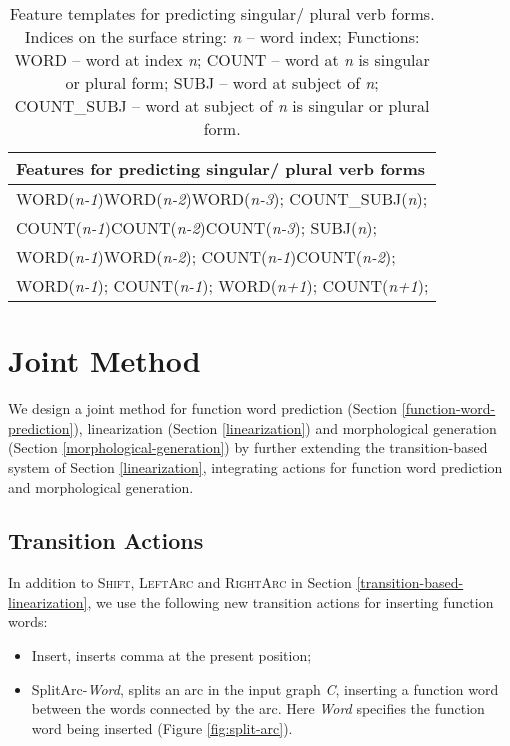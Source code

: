 \documentclass[11pt]{article}
\begin{document}
\begin{table}\centering
\footnotesize
\begin{tabular}{|l|}

  \hline
  Features for predicting singular/ plural verb forms\\
\hline
	WORD({\it n-1})WORD({\it n-2})WORD({\it n-3}); COUNT\_SUBJ({\it n});\\COUNT({\it n-1})COUNT({\it n-2})COUNT({\it n-3}); SUBJ({\it n});\\
	WORD({\it n-1})WORD({\it n-2}); COUNT({\it n-1})COUNT({\it n-2});\\
	WORD({\it n-1}); COUNT({\it n-1});
	WORD({\it n+1}); COUNT({\it n+1});\\	
  \hline
\end{tabular}
\caption{Feature templates for predicting singular/ plural verb forms. Indices on the surface string: {\it n} -- word index; Functions: WORD -- word at index {\it n}; COUNT -- word at {\it n} is singular or plural form; SUBJ -- word at subject of {\it n}; COUNT\_SUBJ -- word at subject of {\it n} is singular or plural form.}
\label{sing-plural-forms}
\end{table}

\section{Joint Method}
\label{joint-method}
We design a joint method for function word prediction (Section \ref{function-word-prediction}), linearization (Section \ref{linearization}) and morphological generation (Section \ref{morphological-generation}) by further extending the transition-based system of Section \ref{linearization}, integrating actions for function word prediction and morphological generation. 


  
\subsection{Transition Actions}
In addition to \textsc{Shift}, \textsc{LeftArc} and \textsc{RightArc} in Section \ref{transition-based-linearization}, we use the following new transition actions for inserting function words:
\begin{itemize}[noitemsep,nolistsep]
\item {\sc Insert}, inserts comma at the present position;
\item {\sc SplitArc}-{\it Word}, splits an arc in the input graph {\it C}, inserting a function word between the words connected by the arc. Here {\it Word} specifies the function word being inserted (Figure \ref{fig:split-arc}).
\end{itemize}
\end{document}
